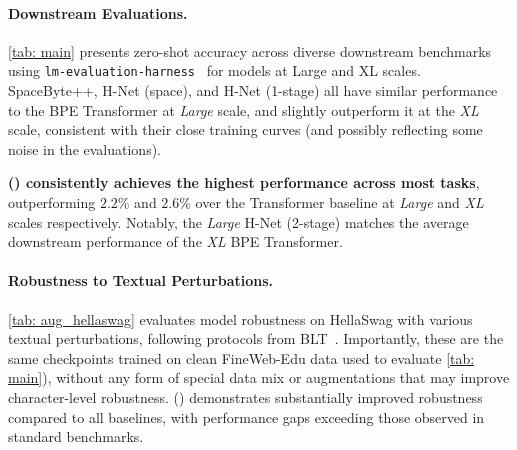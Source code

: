 




\paragraph{Downstream Evaluations.}
\cref{tab: main} presents zero-shot accuracy across diverse downstream benchmarks~\citep{LAMBADA, HellaSwag, PIQA, ARC, WinoGrande, OpenBookQA} using \texttt{lm-evaluation-harness}~\citep{LMEvalHarness} for models at Large and XL scales.
SpaceByte++, H-Net (space), and H-Net (1-stage) all have similar performance to the BPE Transformer at \emph{Large} scale,
and slightly outperform it at the \emph{XL} scale,
consistent with their close training curves (and possibly reflecting some noise in the evaluations).


\textbf{\model{} (\twostage{}) consistently achieves the highest performance across most tasks},
outperforming $2.2$\% and $2.6$\% over the Transformer baseline at \emph{Large} and \emph{XL} scales respectively.
Notably, the \emph{Large} H-Net (2-stage) matches the average downstream performance of the \emph{XL} BPE Transformer.


\paragraph{Robustness to Textual Perturbations.}
\cref{tab: aug_hellaswag} evaluates model robustness on HellaSwag with various textual perturbations, following protocols from BLT~\citep{BLT}.
Importantly, these are the same checkpoints trained on clean FineWeb-Edu data used to evaluate \cref{tab: main}),
without any form of special data mix or augmentations that may improve character-level robustness.
\model{} (\twostage{}) demonstrates substantially improved robustness compared to all baselines, with performance gaps exceeding those observed in standard benchmarks.



